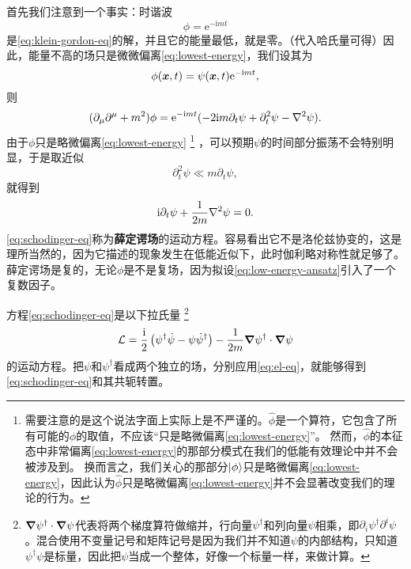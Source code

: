 \documentclass[hyperref, UTF8, a4paper]{ctexart}
\newcommand*{\ii}{\mathrm{i}}
\newcommand*{\ee}{\mathrm{e}}
\begin{document}
首先我们注意到一个事实：时谐波
\begin{equation}
    \phi = \ee^{- \ii m t}
    \label{eq:lowest-energy}
\end{equation}
是\eqref{eq:klein-gordon-eq}的解，并且它的能量最低，就是零。（代入哈氏量可得）因此，能量不高的场只是微微偏离\eqref{eq:lowest-energy}，我们设其为
\begin{equation}
    \phi(\vb*{x}, t) = \psi(\vb*{x}, t) \ee^{- \ii m t},
    \label{eq:low-energy-ansatz}
\end{equation}
则
\[
    (\partial_\mu \partial^\mu + m^2) \phi = \ee^{- \ii m t} (-2 \ii m \partial_t \psi + \partial_t^2 \psi - \laplacian{\psi}).
\]
由于$\phi$只是略微偏离\eqref{eq:lowest-energy}%
\footnote{需要注意的是这个说法字面上实际上是不严谨的。$\hat{\phi}$是一个算符，它包含了所有可能的$\phi$的取值，不应该“只是略微偏离\eqref{eq:lowest-energy}”。
然而，$\hat{\phi}$的本征态中非常偏离\eqref{eq:lowest-energy}的那部分模式在我们的低能有效理论中并不会被涉及到。
换而言之，我们关心的那部分$\ket{\phi}$只是略微偏离\eqref{eq:lowest-energy}，因此认为$\hat{\phi}$只是略微偏离\eqref{eq:lowest-energy}并不会显著改变我们的理论的行为。
}%
，可以预期$\psi$的时间部分振荡不会特别明显，于是取近似
\[
    \partial_t^2 \psi \ll m \partial_t \psi,
\]
就得到
\begin{equation}
    \ii \partial_t \psi + \frac{1}{2m} \laplacian{\psi} = 0.
    \label{eq:schodinger-eq}
\end{equation}
\eqref{eq:schodinger-eq}称为\textbf{薛定谔场}的运动方程。容易看出它不是洛伦兹协变的，这是理所当然的，因为它描述的现象发生在低能近似下，此时伽利略对称性就足够了。
薛定谔场是复的，无论$\phi$是不是复场，因为拟设\eqref{eq:low-energy-ansatz}引入了一个复数因子。

方程\eqref{eq:schodinger-eq}是以下拉氏量%
\footnote{$\grad{\psi}^\dagger \cdot \grad{\psi}$代表将两个梯度算符做缩并，行向量$\psi^\dagger$和列向量$\psi$相乘，即$\partial_i \psi^\dagger \partial^i \psi$。混合使用不变量记号和矩阵记号是因为我们并不知道$\psi$的内部结构，只知道$\psi^\dagger \psi$是标量，因此把$\psi$当成一个整体，好像一个标量一样，来做计算。}
\begin{equation}
    \mathcal{L} = \frac{\ii}{2} \left( \psi^\dagger \dot{\psi} - \psi \dot{\psi}^\dagger \right) - \frac{1}{2m} \grad{\psi^\dagger} \cdot \grad{\psi}
    \label{eq:schodinger-lagrangian}
\end{equation}
的运动方程。把$\psi$和$\psi^\dagger$看成两个独立的场，分别应用\eqref{eq:el-eq}，就能够得到\eqref{eq:schodinger-eq}和其共轭转置。
\end{document}

